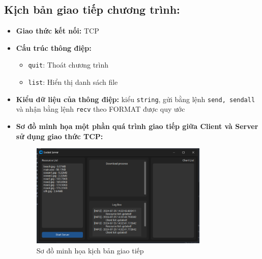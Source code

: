 \documentclass[a4paper,12pt]{report}
\begin{document}
\subsection{Kịch bản giao tiếp chương trình:}
\begin{itemize}
  \item \textbf{Giao thức kết nối:} TCP
  \item \textbf{Cấu trúc thông điệp:}
        \begin{itemize}
          \item \verb|quit|: Thoát chương trình
          \item \verb|list|: Hiển thị danh sách file
        \end{itemize}
  \item \textbf{Kiểu dữ liệu của thông điệp:} kiểu \verb|string|, gửi bằng lệnh \verb|send, sendall| và nhận bằng lệnh \verb|recv| theo FORMAT được quy ước
  \item \textbf{Sơ đồ minh họa một phần quá trình giao tiếp giữa Client và Server sử dụng giao thức TCP:}
        \begin{figure}[ht]
          \centering
          \includegraphics[width=0.8\textwidth]{Screenshots/server-gui.png}
          \caption{Sơ đồ minh họa kịch bản giao tiếp}\label{fig:diagram}
        \end{figure}
\end{itemize}

\pagebreak
\end{document}

